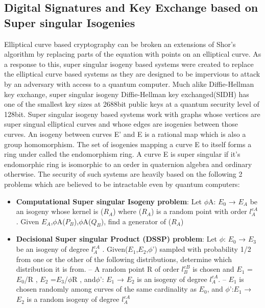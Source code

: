 \documentclass[10pt,a4paper]{IEEEtran}
\begin{document}
\subsection{Digital Signatures and Key Exchange based on Super singular Isogenies}
Elliptical curve based cryptography can be broken an extensions of Shor's algorithm by replacing parts of the equation with points on an elliptical curve. As a response to this, super singular isogeny based systems\cite{supersing} were created to replace the elliptical curve based systems as they are designed to be impervious to attack by an adversary with access to a quantum computer. Much alike Diffie-Hellman key exchange, super singular isogeny Diffie-Hellman key exchanged(SIDH) has one of the smallest key sizes at 2688bit public keys at a quantum security level of 128bit.
\newline
Super singular isogeny based systems work with graphs whose vertices are super singual elliptical curves and whose edges are isogenies between those curves. An isogeny between curves E' and E is a rational map which is also a group homomorphism.
The set of isogenies mapping a curve E to itself forms a ring under called the endomorphism ring. A curve E is super singular if it's endomorphic ring is isomorphic to an order in  quaternion algebra and ordinary otherwise.
\newline
\newline
The security of such systems are heavily based on the following 2 problems which are believed to be intractable even by quantum computers:
\begin{itemize}
\item \textbf{Computational Super singular Isogeny problem}:  Let \(\phi\)A: \(E_0\) → \(E_A\) be an isogeny whose kernel is (\(R_A\))	where (\(R_A\)) is a random point with order \(l^{eA}_A\) . Given \(E_A\),\(\phi\)A(\(P_B\)),\(\phi\)A(\(Q_B\)), ﬁnd a generator of (\(R_A\))	
\item \textbf{Decisional Super singular Product (DSSP) problem}: Let \(\phi\): \(E_0\) → \(E_3\) be an isogeny of degree \(l^{eA}_A\) . Given(\(E_1\),\(E_2\),\(\phi\)') sampled with probability 1/2 from one or the other of the following distributions, determine which distribution it is from.
\subitem –  A random point R of order \(l^{eB}_B\) is chosen and \(E_1\) = \(E_0\)/{R}	, \(E_2\) =\(E_3\)/\(\phi\){R}	, and\(\phi\)': \(E_1\) → \(E_2\) is an isogeny of degree \(l^{eA}_A\).
\subitem – \(E_1\) is chosen randomly among curves of the same cardinality as \(E_0\), and \(\phi\)':\(E_1\) → \(E_2\) is a random isogeny of degree \(l^{eA}_A\)
\end{itemize} 
\end{document}
